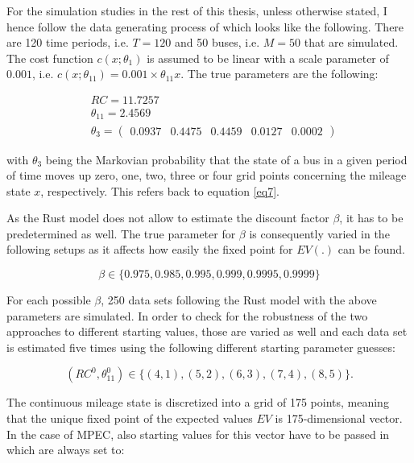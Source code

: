 For the simulation studies in the rest of this thesis, unless otherwise stated, I hence follow the data generating process of \citeauthor{Iskhakov.2016} which looks like the following. There are 120 time periods, i.e. $T=120$ and 50 buses, i.e. $M=50$ that are simulated. The cost function $c(x; \theta_1)$ is assumed to be linear with a scale parameter of $0.001$, i.e. $c(x; \theta_{11}) = 0.001 \times \theta_{11} x$. The true parameters are the following:

\begin{equation*}
	\begin{split}
		& RC = 11.7257 \\
		& \theta_{11} = 2.4569 \\
		& \theta_3 = \begin{pmatrix}
		0.0937 & 0.4475 & 0.4459 & 0.0127 & 0.0002
		\end{pmatrix}
	\end{split}
\end{equation*}

with $\theta_3$ being the Markovian probability that the state of a bus in a given period of time moves up zero, one, two, three or four grid points concerning the mileage state $x$, respectively. This refers back to equation \ref{eq7}.

As the Rust model does not allow to estimate the discount factor $\beta$, it has to be predetermined as well. The true parameter for $\beta$ is consequently varied in the following setups as it affects how easily the fixed point for $EV(.)$ can be found.

\begin{equation*}
	\beta \in \{0.975, 0.985, 0.995, 0.999, 0.9995, 0.9999\}
\end{equation*}

For each possible $\beta$, 250 data sets following the Rust model with the above parameters are simulated. In order to check for the robustness of the two approaches to different starting values, those are varied as well and each data set is estimated five times using the following different starting parameter guesses:

\begin{equation*}
	(RC^0, \theta^0_{11}) \in \{(4,1), (5, 2), (6, 3), (7, 4), (8, 5)\}.
\end{equation*}

The continuous mileage state is discretized into a grid of 175 points, meaning that the unique fixed point of the expected values $EV$ is 175-dimensional vector. In the case of MPEC, also starting values for this vector have to be passed in which are always set to:

